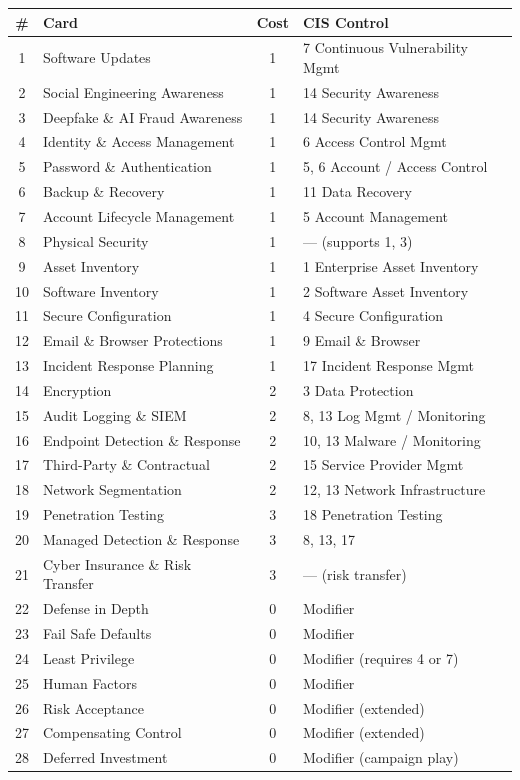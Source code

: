 \documentclass[11pt,letterpaper]{article}
\begin{document}
\begin{center}
\small
\begin{tabularx}{\textwidth}{@{}c l c X@{}}
\toprule
\textbf{\#} & \textbf{Card} & \textbf{Cost} & \textbf{CIS Control} \\
\midrule
1 & Software Updates & 1 & 7 Continuous Vulnerability Mgmt \\
2 & Social Engineering Awareness & 1 & 14 Security Awareness \\
3 & Deepfake \& AI Fraud Awareness & 1 & 14 Security Awareness \\
4 & Identity \& Access Management & 1 & 6 Access Control Mgmt \\
5 & Password \& Authentication & 1 & 5, 6 Account / Access Control \\
6 & Backup \& Recovery & 1 & 11 Data Recovery \\
7 & Account Lifecycle Management & 1 & 5 Account Management \\
8 & Physical Security & 1 & --- (supports 1, 3) \\
9 & Asset Inventory & 1 & 1 Enterprise Asset Inventory \\
10 & Software Inventory & 1 & 2 Software Asset Inventory \\
11 & Secure Configuration & 1 & 4 Secure Configuration \\
12 & Email \& Browser Protections & 1 & 9 Email \& Browser \\
13 & Incident Response Planning & 1 & 17 Incident Response Mgmt \\
14 & Encryption & 2 & 3 Data Protection \\
15 & Audit Logging \& SIEM & 2 & 8, 13 Log Mgmt / Monitoring \\
16 & Endpoint Detection \& Response & 2 & 10, 13 Malware / Monitoring \\
17 & Third-Party \& Contractual & 2 & 15 Service Provider Mgmt \\
18 & Network Segmentation & 2 & 12, 13 Network Infrastructure \\
19 & Penetration Testing & 3 & 18 Penetration Testing \\
20 & Managed Detection \& Response & 3 & 8, 13, 17 \\
21 & Cyber Insurance \& Risk Transfer & 3 & --- (risk transfer) \\
\midrule
22 & Defense in Depth & 0 & Modifier \\
23 & Fail Safe Defaults & 0 & Modifier \\
24 & Least Privilege & 0 & Modifier (requires 4 or 7) \\
25 & Human Factors & 0 & Modifier \\
26 & Risk Acceptance & 0 & Modifier (extended) \\
27 & Compensating Control & 0 & Modifier (extended) \\
28 & Deferred Investment & 0 & Modifier (campaign play) \\
\bottomrule
\end{tabularx}
\end{center}
\end{document}
